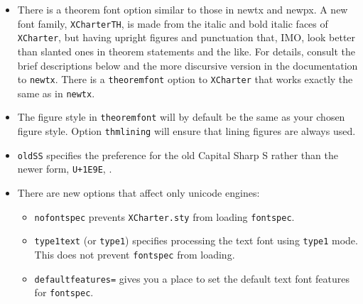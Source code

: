 \documentclass[11pt]{article}
\begin{document}
\begin{itemize}
\item
There is a theorem font option similar to those in newtx and newpx. A new font family, {\tt XCharterTH}, is made from the italic and bold italic faces of {\tt XCharter}, but having upright figures and punctuation that, IMO, look better than slanted ones in theorem statements and the like. For details, consult the brief descriptions below and the more discursive version in the documentation to {\tt newtx}. There is a {\tt theoremfont} option to {\tt XCharter} that works exactly the same as in {\tt newtx}.
\item The figure style in {\tt theoremfont} will by default be the same as your chosen figure style. Option {\tt thmlining} will ensure that lining figures are always used.
\item {\tt oldSS} specifies the preference for the old Capital Sharp S rather than the newer form, {\tt U+1E9E}\iftutex, \SS\fi.
\item There are new options that affect only unicode engines:
\begin{itemize}
\item
{\tt nofontspec} prevents {\tt XCharter.sty} from loading {\tt fontspec}.
\item {\tt type1text} (or {\tt type1})  specifies processing the text font using {\tt type1} mode. This does not prevent {\tt fontspec} from loading.
\item {\tt defaultfeatures=} gives you a place to set the default text font features for {\tt fontspec}.
\end{itemize}
\end{itemize}
\end{document}
